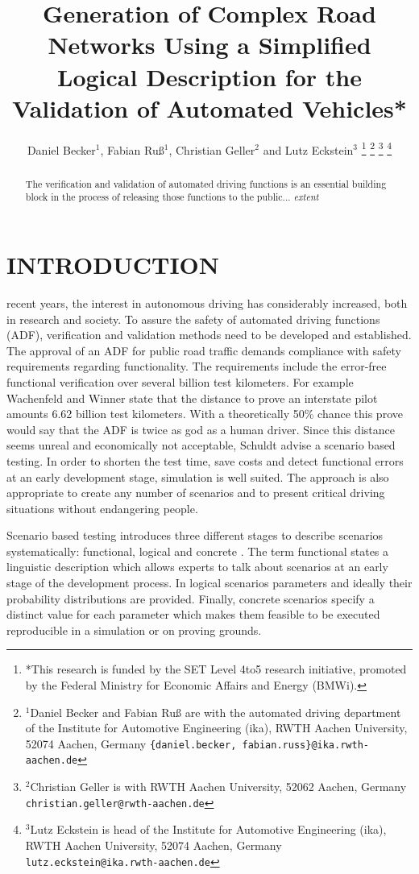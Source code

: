 \documentclass[a4paper, 10pt, conference]{ieeeconf}      %
\title{\LARGE \bf
Generation of Complex Road Networks Using a Simplified Logical Description for the Validation of Automated Vehicles*
}
\author{Daniel Becker$^{1}$, Fabian Ru{\ss}$^{1}$, Christian Geller$^2$ and Lutz Eckstein$^{3}$%
\thanks{*This research is funded by the SET Level 4to5 research initiative, promoted by the	Federal Ministry for Economic Affairs and Energy (BMWi).}%
\thanks{$^{1}$Daniel Becker and Fabian Ru{\ss} are with the automated driving department of the Institute for Automotive Engineering (ika), RWTH Aachen University, 52074 	Aachen, Germany {\tt\small \{daniel.becker, fabian.russ\}@ika.rwth-aachen.de}}%
\thanks{$^{2}$Christian Geller is with RWTH Aachen University, 52062 Aachen, Germany
	{\tt\small christian.geller@rwth-aachen.de}}%
\thanks{$^{3}$Lutz Eckstein is head of the Institute for Automotive Engineering (ika), RWTH Aachen University, 52074 Aachen, Germany {\tt\small lutz.eckstein@ika.rwth-aachen.de}}%
}
\begin{document}
\maketitle
\thispagestyle{empty}
\pagestyle{empty}

\begin{abstract} %
The verification and validation of automated driving functions is an essential building block in the process of releasing those functions to the public... \emph{extent}  
\end{abstract}

\section{INTRODUCTION}
 recent years, the interest in autonomous driving has considerably increased, both in research and society. To assure the safety of automated driving functions (ADF), verification and validation methods need to be developed and established. The approval of an ADF for public road traffic demands compliance with safety requirements regarding functionality. The requirements include the error-free functional verification over several billion test kilometers. For example Wachenfeld and Winner \cite{wachenfeld2016release} state that the distance to prove an interstate pilot amounts 6.62 billion test kilometers. With a theoretically 50\% chance this prove would say that the ADF is twice as god as a human driver. Since this distance seems unreal and economically not acceptable, Schuldt \cite{schuldt2017beitrag} advise a scenario based testing. In order to shorten the test time, save costs and detect functional errors at an early development stage, simulation is well suited. The approach is also appropriate to create any number of scenarios and to present critical driving situations without endangering people.

Scenario based testing introduces three different stages to describe scenarios systematically: functional, logical and concrete \cite{menzel2018scenarios}. The term functional states a linguistic description which allows experts to talk about scenarios at an early stage of the development process. In logical scenarios parameters and ideally their probability distributions are provided. Finally, concrete scenarios specify a distinct value for each parameter which makes them feasible to be executed reproducible in a simulation or on proving grounds. 
\end{document}
